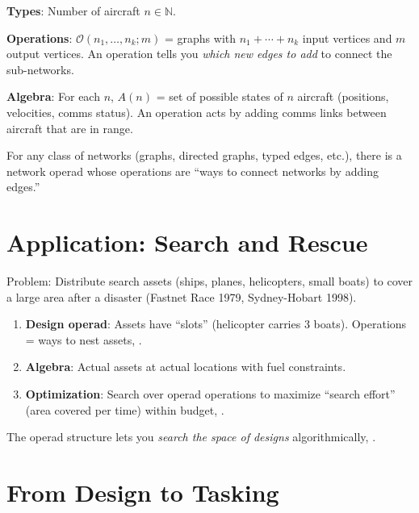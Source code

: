 \begin{example}
\textbf{Types}: Number of aircraft $n \in \mathbb{N}$.

\textbf{Operations}: $\mathcal{O}(n_1,\dots,n_k; m)$ = graphs with $n_1+\cdots+n_k$ input vertices and $m$ output vertices. An operation tells you \emph{which new edges to add} to connect the sub-networks.

\textbf{Algebra}: For each $n$, $A(n)$ = set of possible states of $n$ aircraft (positions, velocities, comms status). An operation acts by adding comms links between aircraft that are in range.
\end{example}

\begin{theorem}
For any class of networks (graphs, directed graphs, typed edges, etc.), there is a network operad whose operations are ``ways to connect networks by adding edges.'' \cite{baez2021operads}
\end{theorem}

\section{Application: Search and Rescue}
\label{sec:op:sar}

Problem: Distribute search assets (ships, planes, helicopters, small boats) to cover a large area after a disaster (Fastnet Race 1979, Sydney-Hobart 1998).

\begin{enumerate}
    \item \textbf{Design operad}: Assets have ``slots'' (helicopter carries 3 boats). Operations = ways to nest assets, \cite{baez2021operads}.
    \item \textbf{Algebra}: Actual assets at actual locations with fuel constraints.
    \item \textbf{Optimization}: Search over operad operations to maximize ``search effort'' (area covered per time) within budget, \cite{baez2021operads}.
\end{enumerate}

The operad structure lets you \emph{search the space of designs} algorithmically, \cite{baez2021operads}.

\section{From Design to Tasking}
\label{sec:op:tasking}


